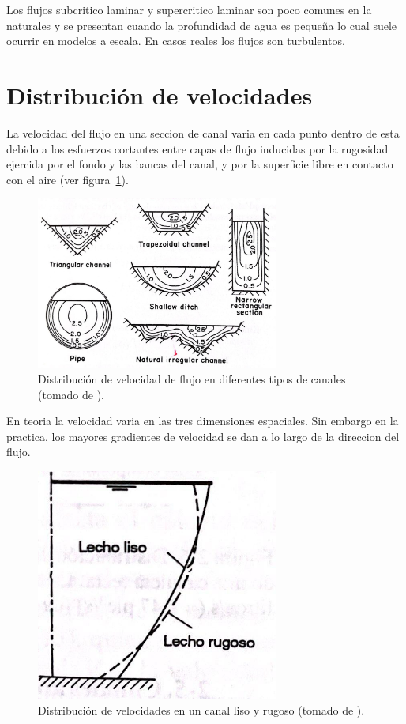 \documentclass[11pt, oneside]{article}
\begin{document}
Los flujos subcritico laminar y supercritico laminar son poco comunes en la naturales y se presentan cuando la profundidad de agua es pequeña lo cual suele ocurrir en modelos a escala. En casos reales los flujos son turbulentos.

\section{Distribuci\'on de velocidades}%
La velocidad del flujo en una seccion de canal varia en cada punto dentro de esta debido a los esfuerzos cortantes entre capas de flujo inducidas por la rugosidad ejercida por el fondo y las bancas del canal, y por la superficie libre en contacto con el aire (ver figura~\ref{fig5}).

\begin{figure}[h]
\centering
\includegraphics[width=8cm]{fig5.jpeg}
\caption{Distribuci\'on de velocidad de flujo en diferentes tipos de canales (tomado de \cite{Chau}).}
\label{fig5}
\end{figure}


En teoria la velocidad varia en las tres dimensiones espaciales. Sin embargo en la practica, los mayores gradientes de velocidad se dan a lo largo de la direccion del flujo. 
\begin{figure}[h]
\centering
\includegraphics[width=8cm]{fig6.jpeg}
\caption{Distribuci\'on de velocidades en un canal liso y rugoso (tomado de \cite{VChow}).}
\label{fig6}
\end{figure}
\end{document}
